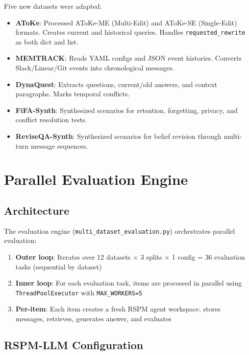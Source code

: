 \documentclass[11pt,a4paper]{article}
\begin{document}
Five new datasets were adapted:
\begin{itemize}
    \item \textbf{AToKe}: Processed AToKe-ME (Multi-Edit) and AToKe-SE (Single-Edit) formats. Creates current and historical queries. Handles \texttt{requested\_rewrite} as both dict and list.
    \item \textbf{MEMTRACK}: Reads YAML configs and JSON event histories. Converts Slack/Linear/Git events into chronological messages.
    \item \textbf{DynaQuest}: Extracts questions, current/old answers, and context paragraphs. Marks temporal conflicts.
    \item \textbf{FiFA-Synth}: Synthesized scenarios for retention, forgetting, privacy, and conflict resolution tests.
    \item \textbf{ReviseQA-Synth}: Synthesized scenarios for belief revision through multi-turn message sequences.
\end{itemize}

\section{Parallel Evaluation Engine}

\subsection{Architecture}

The evaluation engine (\texttt{multi\_dataset\_evaluation.py}) orchestrates parallel evaluation:

\begin{enumerate}
    \item \textbf{Outer loop}: Iterates over 12 datasets $\times$ 3 splits $\times$ 1 config = 36 evaluation tasks (sequential by dataset)
    \item \textbf{Inner loop}: For each evaluation task, items are processed in parallel using \texttt{ThreadPoolExecutor} with \texttt{MAX\_WORKERS=5}
    \item \textbf{Per-item}: Each item creates a fresh RSPM agent workspace, stores messages, retrieves, generates answer, and evaluates
\end{enumerate}

\subsection{RSPM-LLM Configuration}
\end{document}

